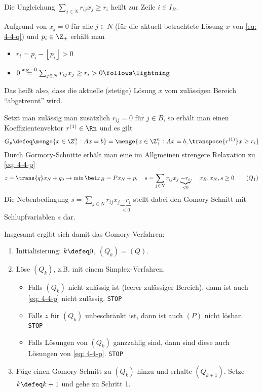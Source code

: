 \begin{definition}
	Die Ungleichung $\sum_{j \in N} r_{ij} x_j \ge r_i$ heißt  zur Zeile $i \in I_B$.
\end{definition}

Aufgrund von $x_j = 0$ für alle $j \in N$ (für die aktuell betrachtete Lösung $x$ von \eqref{eq: 4-4-q}) und $p_i \in \Z_+$ erhält man
\begin{itemize}
	\item $r_i = p_i - \left\lfloor p_i \right\rfloor > 0$
	\item $0 \overset{x_N = 0}{=} \sum_{j \in N} r_{ij} x_j \ge r_i > 0 \follows \lightning$ 
\end{itemize}
Das heißt also, dass die aktuelle (stetige) Lösung $x$ vom zulässigen Bereich \enquote{abgetrennt} wird.

Setzt man zulässig man zusätzlich $r_{ij} = 0$ für $j \in B$, so erhält man einen Koeffizientenvektor $r^{(1)} \in \Rn$ und es gilt
\begin{equation*}
	G_p \defeq \menge{x \in \Z_+^n: Ax = b} = \menge{x \in \Z_+^n: Ax = b, \transpose{r^{(1)}} x \ge r_i}
\end{equation*}
Durch Gormory-Schnitte erhält man eine im Allgmeinen strengere Relaxation zu \eqref{eq: 4-4-p}
\begin{equation*}
	z = \trans{q} x_N + q_0 \to \min \bei x_B = Px_ N + p, \quad s = \sum_{j \in N} r_{ij} x_j \underbrace{- r_i}_{< 0}, \quad x_B, x_N, s \ge 0
	\tag{$Q_1$} \label{eq: 4-4-q1}
\end{equation*}
Die Nebenbedingung $s = \sum_{j \in N} r_{ij} x_j \underbrace{- r_i}_{< 0}$ stellt dabei den Gomory-Schnitt mit Schlupfvariablen $s$ dar.

Insgesamt ergibt sich damit das Gomory-Verfahren:
\begin{enumerate}[label=Schritt \arabic*:, nolistsep, leftmargin=*, start=0]
	\item Initialisierung: $k \defeq 0$, $(Q_k) = (Q)$.
	\item Löse $(Q_k)$, z.B. mit einem Simplex-Verfahren. 
	\begin{itemize}
		\item Falls $(Q_k)$ nicht zulässig ist (leerer zulässiger Bereich), dann ist auch \eqref{eq: 4-4-p} nicht zulässig. \texttt{STOP}
		\item Falls $z$ für $(Q_k)$ unbeschränkt ist, dann ist auch $(P)$ nicht lösbar. \texttt{STOP}
		\item Falls Lösungen von $(Q_k)$ ganzzahlig sind, dann sind diese auch Lösungen von \eqref{eq: 4-4-p}. \texttt{STOP}
	\end{itemize}
	\item Füge einen Gomory-Schnitt zu $(Q_k)$ hinzu und erhalte $(Q_{k+1})$. Setze $k \defeq k+1$ und gehe zu Schritt 1.
\end{enumerate}

